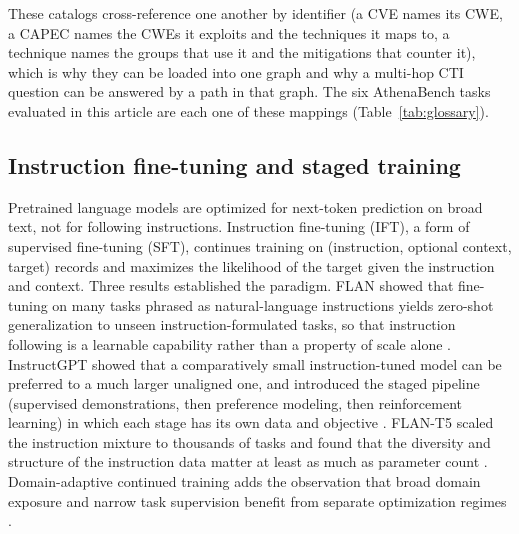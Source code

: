 \documentclass[a4paper,fleqn]{cas-dc}
\begin{document}
These catalogs cross-reference one another by identifier (a CVE names its CWE, a CAPEC names the CWEs it exploits and the techniques it maps to, a technique names the groups that use it and the mitigations that counter it), which is why they can be loaded into one graph and why a multi-hop CTI question can be answered by a path in that graph. The six AthenaBench tasks evaluated in this article are each one of these mappings (Table~\ref{tab:glossary}).

\subsection{Instruction fine-tuning and staged training}\label{sec:bg-ift}
Pretrained language models are optimized for next-token prediction on broad text, not for following instructions. Instruction fine-tuning (IFT), a form of supervised fine-tuning (SFT), continues training on (instruction, optional context, target) records and maximizes the likelihood of the target given the instruction and context. Three results established the paradigm. FLAN showed that fine-tuning on many tasks phrased as natural-language instructions yields zero-shot generalization to unseen instruction-formulated tasks, so that instruction following is a learnable capability rather than a property of scale alone \citep{wei2022flan}. InstructGPT showed that a comparatively small instruction-tuned model can be preferred to a much larger unaligned one, and introduced the staged pipeline (supervised demonstrations, then preference modeling, then reinforcement learning) in which each stage has its own data and objective \citep{ouyang2022instructgpt}. FLAN-T5 scaled the instruction mixture to thousands of tasks and found that the diversity and structure of the instruction data matter at least as much as parameter count \citep{chung2024flant5}. Domain-adaptive continued training adds the observation that broad domain exposure and narrow task supervision benefit from separate optimization regimes \citep{gururangan2020dontstop}.
\end{document}
